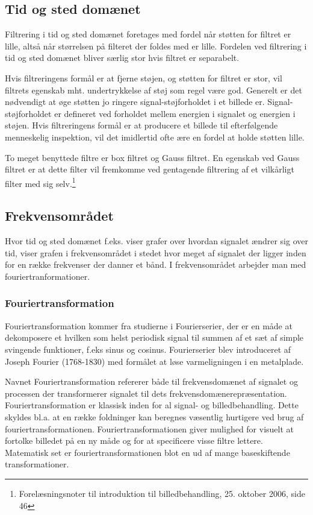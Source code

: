 \subsection{Tid og sted domænet}
Filtrering i tid og sted domænet foretages med fordel når støtten for filtret er lille, altså når størrelsen på filteret der foldes med er lille. Fordelen ved filtrering i tid og sted domænet bliver særlig stor hvis filtret er separabelt. 

Hvis filtreringens formål er at fjerne støjen, og støtten for filtret er stor, vil filtrets egenskab mht. undertrykkelse af støj som regel være god. Generelt er det nødvendigt at øge støtten jo ringere signal-støjforholdet i et billede er. Signal-støjforholdet er defineret ved forholdet mellem energien i signalet og energien i støjen. Hvis filtreringens formål er at producere et billede til efterfølgende menneskelig inspektion, vil det imidlertid ofte ære en fordel at holde støtten lille.

To meget benyttede filtre er box filtret og Gauss filtret. En egenskab ved Gauss filtret er at dette filter vil fremkomme ved gentagende filtrering af et vilkårligt filter med sig selv.\footnote{Forelæsningsnoter til introduktion til billedbehandling, 25. oktober 2006, side 46}

\subsection{Frekvensområdet}
Hvor tid og sted domænet f.eks. viser grafer over hvordan signalet ændrer sig over tid, viser grafen i frekvensområdet i stedet hvor meget af signalet der ligger inden for en række frekvenser der danner et bånd. I frekvensområdet arbejder man med fouriertranformationer.

\subsubsection{Fouriertransformation}
Fouriertransformation kommer fra studierne i Fourierserier, der er en måde at dekomposere et hvilken som helst periodisk signal til summen af et sæt af simple svingende funktioner, f.eks sinus og cosinus. Fourierserier blev introduceret af Joseph Fourier (1768-1830) med formålet at løse varmeligningen i en metalplade.

Navnet Fouriertransformation refererer både til frekvensdomænet af signalet og processen der transformerer signalet til dets frekvensdomænerepræsentation. Fouriertransformation er klassisk inden for al signal- og billedbehandling. Dette skyldes bl.a. at en række foldninger kan beregnes væsentlig hurtigere ved brug af fouriertransformationen. Fouriertransformationen giver mulighed for visuelt at fortolke billedet på en ny måde og for at specificere visse filtre lettere. Matematisk set er fouriertransformationen blot en ud af mange baseskiftende transformationer.

